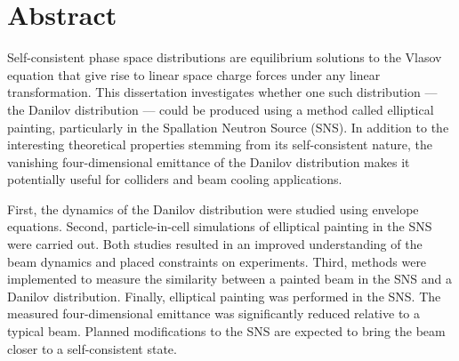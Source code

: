 \chapter*{Abstract} 


Self-consistent phase space distributions are equilibrium solutions to the Vlasov equation that give rise to linear space charge forces under any linear transformation. This dissertation investigates whether one such distribution — the Danilov distribution — could be produced using a method called elliptical painting, particularly in the Spallation Neutron Source (SNS). In addition to the interesting theoretical properties stemming from its self-consistent nature, the vanishing four-dimensional emittance of the Danilov distribution makes it potentially useful for colliders and beam cooling applications.

First, the dynamics of the Danilov distribution were studied using envelope equations. Second, particle-in-cell simulations of elliptical painting in the SNS were carried out. Both studies resulted in an improved understanding of the beam dynamics and placed constraints on experiments. Third, methods were implemented to measure the similarity between a painted beam in the SNS and a Danilov distribution. Finally, elliptical painting was performed in the SNS. The measured four-dimensional emittance was significantly reduced relative to a typical beam. Planned modifications to the SNS are expected to bring the beam closer to a self-consistent state.